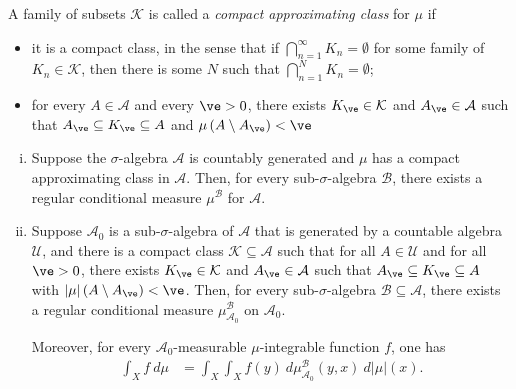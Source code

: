 \documentclass[10pt]{mypackage}
\begin{document}
\begin{definition}
  A family of subsets $\mathcal{K}$ is called a \textit{compact approximating class} for $ \mu $ if
  \begin{itemize}
    \item it is a compact class, in the sense that if $\bigcap_{n=1}^{\infty}K_n = \emptyset$ for some family of $K_n\in \mathcal{K}$, then there is some $N$ such that $\bigcap_{n=1}^{N}K_n = \emptyset$;
    \item for every $A\in \mathcal{A}$ and every $\ve > 0$, there exists $K_{\ve}\in \mathcal{K}$ and $A_{\ve}\in \mathcal{A}$ such that $A_{\ve}\subseteq K_{\ve}\subseteq A$ and $\mu\left( A\setminus A_{\ve} \right) < \ve$
  \end{itemize}
\end{definition}
\begin{theorem}[Existence]\hfill
  \begin{enumerate}[(i)]
    \item Suppose the $\sigma$-algebra $\mathcal{A}$ is countably generated and $\mu$ has a compact approximating class in $ \mathcal{A} $. Then, for every sub-$\sigma$-algebra $ \mathcal{B} $, there exists a regular conditional measure $\mu^{\mathcal{B}}$ for $ \mathcal{A} $.
    \item Suppose $\mathcal{A}_0$ is a sub-$\sigma$-algebra of $ \mathcal{A} $ that is generated by a countable algebra $ \mathcal{U} $, and there is a compact class $\mathcal{K}\subseteq \mathcal{A}$ such that for all $A\in \mathcal{U}$ and for all $\ve > 0$, there exists $K_{\ve}\in \mathcal{K}$ and $A_{\ve}\in \mathcal{A}$ such that $A_{\ve}\subseteq K_{\ve}\subseteq A$ with $\left\vert \mu \right\vert\left( A\setminus A_{\ve} \right) < \ve$. Then, for every sub-$\sigma$-algebra $\mathcal{B}\subseteq \mathcal{A}$, there exists a regular conditional measure $\mu^{\mathcal{B}}_{\mathcal{A}_0}$ on $\mathcal{A}_0$.

      Moreover, for every $\mathcal{A}_0$-measurable $\mu$-integrable function $f$, one has
      \begin{align*}
        \int_{X}^{} f\:d\mu &= \int_{X}^{} \int_{X}^{} f(y)\:d\mu^{\mathcal{B}}_{\mathcal{A}_0}\left( y,x \right)\:d\left\vert \mu \right\vert\left( x \right).
      \end{align*}
  \end{enumerate}
\end{theorem}
\end{document}
